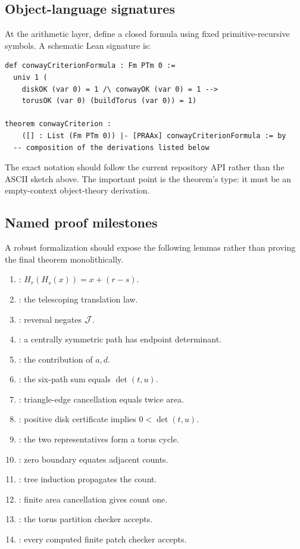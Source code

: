 \subsection{Object-language signatures}

At the arithmetic layer, define a closed formula using fixed primitive-recursive symbols.  A schematic Lean signature is:

\begin{lstlisting}
def conwayCriterionFormula : Fm PTm 0 :=
  univ 1 (
    diskOK (var 0) = 1 /\ conwayOK (var 0) = 1 -->
    torusOK (var 0) (buildTorus (var 0)) = 1)

theorem conwayCriterion :
    ([] : List (Fm PTm 0)) |- [PRAAx] conwayCriterionFormula := by
  -- composition of the derivations listed below
\end{lstlisting}

The exact notation should follow the current repository API rather than the ASCII sketch above.  The important point is the theorem's type: it must be an empty-context object-theory derivation.

\subsection{Named proof milestones}

A robust formalization should expose the following lemmas rather than proving the final theorem monolithically.

\begin{enumerate}[label=\textbf{L\arabic*.}]
\item {}: \(H_r(H_s(x))=x+(r-s)\).
\item {}: the telescoping translation law.
\item {}: reversal negates \(\mathcal J\).
\item {}: a centrally symmetric path has endpoint determinant.
\item {}: the contribution of \(a,d\).
\item {}: the six-path sum equals \(\det(t,u)\).
\item {}: triangle-edge cancellation equals twice area.
\item {}: positive disk certificate implies \(0<\det(t,u)\).
\item {}: the two representatives form a torus cycle.
\item {}: zero boundary equates adjacent counts.
\item {}: tree induction propagates the count.
\item {}: finite area cancellation gives count one.
\item {}: the torus partition checker accepts.
\item {}: every computed finite patch checker accepts.
\end{enumerate}

